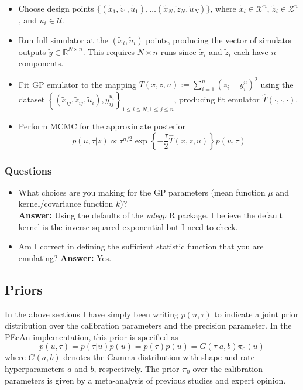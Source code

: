 \documentclass[12pt]{article}
\newcommand{\R}{\mathcal{R}}
\def\R{\mathbb{R}}
\begin{document}
\begin{itemize}
\item Choose design points $\{(\tilde{x}_1, \tilde{z}_1, \tilde{u}_1), \dots (\tilde{x}_N, \tilde{z}_N, \tilde{u}_N)\}$, where $\tilde{x}_i \in \mathcal{X}^n$, $\tilde{z}_i \in \mathcal{Z}^n$, and $u_i \in \mathcal{U}$. 
\item Run full simulator at the $(\tilde{x}_i, \tilde{u}_i)$ points, producing the vector of simulator outputs $\tilde{y} \in \R^{N \times n}$. This requires $N \times n$ runs since $\tilde{x}_i$ and $\tilde{z}_i$
each have $n$ components. 
\item Fit GP emulator to the mapping $T(x, z, u) := \sum_{i = 1}^n (z_i - y_i^{u})^2$ using the dataset $\left\{(\tilde{x}_{ij}, \tilde{z}_{ij}, \tilde{u}_i), y_{ij}^{\tilde{u}_i}\right\}_{1 \leq i \leq N, 1 \leq j \leq n}$, producing fit emulator $\hat{T}(\cdot, \cdot, \cdot)$. 
\item Perform MCMC for the approximate posterior
\[p(u, \tau|z) \propto \tau^{n/2} \exp\left\{-\frac{\tau}{2} \hat{T}(x, z, u) \right\}p(u, \tau)\]
\end{itemize}

\subsubsection{Questions}
\begin{itemize}
\item What choices are you making for the GP parameters (mean function $\mu$ and kernel/covariance function $k$)? \\
\textbf{Answer: } Using the defaults of the \textit{mlegp} R package. I believe the default kernel is the inverse squared exponential but I need to check. 
\item Am I correct in defining the sufficient statistic function that you are emulating? 
\textbf{Answer: } Yes. 
\end{itemize}

\subsection{Priors}
In the above sections I have simply been writing $p(u, \tau)$ to indicate a joint prior distribution over the calibration parameters and the precision parameter. In the PEcAn implementation, 
this prior is specified as
\[p(u, \tau) = p(\tau|u)p(u) = p(\tau)p(u) = G(\tau|a, b)\pi_0(u)\]
where $G(a, b)$ denotes the Gamma distribution with shape and rate hyperparameters $a$ and $b$, respectively. The prior $\pi_0$ over the calibration parameters is given by a meta-analysis
of previous studies and expert opinion. 
\end{document}
